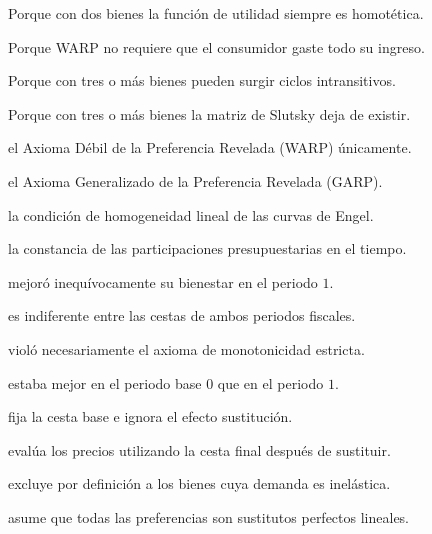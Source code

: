 \begin{opts}
    \item Porque con dos bienes la función de utilidad siempre es homotética.
    \item Porque WARP no requiere que el consumidor gaste todo su ingreso.
    \item Porque con tres o más bienes pueden surgir ciclos intransitivos.
    \item Porque con tres o más bienes la matriz de Slutsky deja de existir.
\end{opts}

\begin{opts}
    \item el Axioma Débil de la Preferencia Revelada (WARP) únicamente.
    \item el Axioma Generalizado de la Preferencia Revelada (GARP).
    \item la condición de homogeneidad lineal de las curvas de Engel.
    \item la constancia de las participaciones presupuestarias en el tiempo.
\end{opts}

\begin{opts}
    \item mejoró inequívocamente su bienestar en el periodo $1$.
    \item es indiferente entre las cestas de ambos periodos fiscales.
    \item violó necesariamente el axioma de monotonicidad estricta.
    \item estaba mejor en el periodo base $0$ que en el periodo $1$.
\end{opts}

\begin{opts}
    \item fija la cesta base e ignora el efecto sustitución.
    \item evalúa los precios utilizando la cesta final después de sustituir.
    \item excluye por definición a los bienes cuya demanda es inelástica.
    \item asume que todas las preferencias son sustitutos perfectos lineales.
\end{opts}

